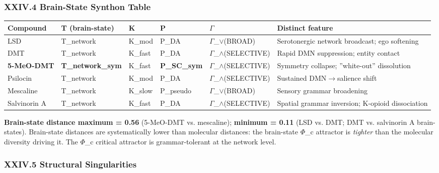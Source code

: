 \documentclass[12pt,a4paper]{article}
\begin{document}
\subsubsection{XXIV.4 Brain-State Synthon Table}

\begin{table}[htbp]
\centering
\small
{}
\begin{tabularx}{\textwidth}{>{\centering\arraybackslash}X >{\centering\arraybackslash}X >{\centering\arraybackslash}X >{\centering\arraybackslash}X >{\centering\arraybackslash}X >{\centering\arraybackslash}X}
\toprule
\rowcolor{gray!25}\textbf{Compound} & \textbf{T (brain-state)} & \textbf{K} & \textbf{P} & \textbf{$\Gamma$} & \textbf{Distinct feature} \\
\midrule
\rowcolors{1}{white}{gray!10}
LSD & T\_network & K\_mod & P\_DA & $\Gamma$\_$\lor$(BROAD) & Serotonergic network broadcast; ego softening \\
DMT & T\_network & K\_fast & P\_DA & $\Gamma$\_$\land$(SELECTIVE) & Rapid DMN suppression; entity contact \\
\textbf{5-MeO-DMT} & \textbf{T\_network\_sym} & K\_fast & \textbf{P\_SC\_sym} & $\Gamma$\_$\land$(SELECTIVE) & Symmetry collapse; ''white-out'' dissolution \\
Psilocin & T\_network & K\_mod & P\_DA & $\Gamma$\_$\land$(SELECTIVE) & Sustained DMN$\rightarrow$salience shift \\
Mescaline & T\_network & K\_slow & P\_pseudo & $\Gamma$\_$\lor$(BROAD) & Sensory grammar broadening \\
Salvinorin A & T\_network & K\_fast & P\_DA & $\Gamma$\_$\land$(SELECTIVE) & Spatial grammar inversion; K-opioid dissociation \\
\bottomrule
\end{tabularx}
\end{table}

\textbf{Brain-state distance maximum = 0.56} (5-MeO-DMT vs. mescaline); \textbf{minimum = 0.11} (LSD vs. DMT; DMT vs. salvinorin A brain-states). Brain-state distances are systematically lower than molecular distances: the brain-state $\Phi$\_c attractor is \emph{tighter} than the molecular diversity driving it. The $\Phi$\_c critical attractor is grammar-tolerant at the network level.

\subsubsection{XXIV.5 Structural Singularities}
\end{document}
